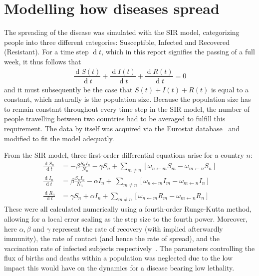 \documentclass[a4paper,12pt]{article}
\renewcommand{\d}[1]{\ensuremath{\operatorname{d}\!{#1}}} %
\theoremstyle{plain}
\theoremstyle{definition}
\begin{document}
\section*{Modelling how diseases spread}
	\setcounter{equation}{0}
   The spreading of the disease was simulated with the SIR model, categorizing
   people into three different categories: Susceptible, Infected and Recovered
   (Resistant). For a time step $\d t$, which in this report signifies the
   passing of a full week, it thus follows that 
   \begin{align}
      \dfrac{\d S(t)}{\d t} + \dfrac{\d I(t)}{\d t} +
      \dfrac{\d R(t)}{\d t} = 0 
      \label{eq:SIR}
   \end{align}
   and it must subsequently be the case that $S(t) + I(t) + R(t)$ is equal to a
   constant, which naturally is the population size. Because the population size
   has to remain constant throughout every time step in the SIR model, the 
   number of people travelling between two countries had to be averaged to 
   fulfill this requirement. The data by itself was acquired via the
   Eurostat database~\cite{eurostat} and modified to fit the model adequatly.    

   From the SIR model, three first-order differential equations arise for a
   country $n$:
   \begin{align}
      \frac{\d S_n}{\d t} &= -\beta\frac{S_nI_n}{N_n} - \gamma S_n +
         \sum_{m \neq n} \left[ \omega_{n \leftarrow m }S_m - \omega_{m
         \leftarrow n}S_n \right ]  \\
      \frac{\d I_n}{\d t} &= \beta\frac{S_nI_n}{N_n} - \alpha I_n  + \
         \sum_{m \neq n} \left[ \omega_{n \leftarrow m }I_m - \omega_{m
         \leftarrow n}I_n \right ] \\
      \frac{\d R_n}{\d t} &= \gamma S_n + \alpha I_n + 
         \sum_{m \neq n} \left[ \omega_{n \leftarrow m }R_m - \omega_{m
         \leftarrow n}R_n \right ] 
      \label{eq:sireqs}
   \end{align}
   These were all calculated numerically using a fourth-order Runge-Kutta
   method, allowing for a local error scaling as the step size to the fourth
   power. Moreover, here $\alpha, \beta$ and $\gamma$ represent the rate of recovery (with
   implied afterwardly immunity), the rate of contact (and hence the rate of
   spread), and the vaccination rate of infected subjects
   respectively~\cite{lecnotes}. The
   parameters controlling the flux of births and deaths within a
   population was neglected due to the low impact this would have on the
   dynamics for a disease bearing low lethality. 
   
\end{document}
